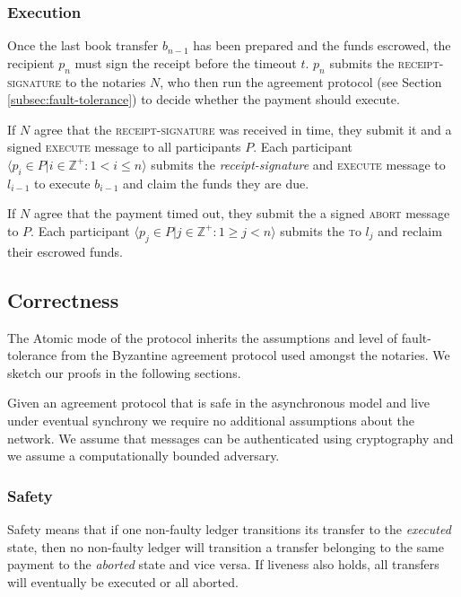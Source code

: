 \documentclass[letterpaper,twocolumn,10pt]{article}
\begin{document}
\subsubsection{Execution}

Once the last book transfer $b_{n-1}$ has been prepared and the funds escrowed, the recipient $p_n$ must sign the receipt before the timeout $t$. 
$p_n$ submits the \textsc{receipt-signature} to the notaries $N$, who then run the agreement protocol (see Section \ref{subsec:fault-tolerance}) to decide whether the payment should execute. 

If $N$ agree that the \textsc{receipt-signature} was received in time, they submit it and a signed \textsc{execute} message to all participants $P$. Each participant $ \langle p_i \in P | i \in \mathbb{Z}^+ : 1 < i \leq n \rangle $ submits the \textit{receipt-signature} and \textsc{execute} message to $l_{i-1}$ to execute $b_{i-1}$ and claim the funds they are due.

If $N$ agree that the payment timed out, they submit the a signed \textsc{abort} message to $P$. Each participant $ \langle p_j \in P | j \in \mathbb{Z}^+ : 1 \geq j < n \rangle $ submits the \textsc to $l_j$ and reclaim their escrowed funds. 

\subsection{Correctness}

The Atomic mode of the protocol inherits the assumptions and level of fault-tolerance from the Byzantine agreement protocol used amongst the notaries. We sketch our proofs in the following sections.

Given an agreement protocol that is safe in the asynchronous model and live under eventual synchrony we require no additional assumptions about the network. We assume that messages can be authenticated using cryptography and we assume a computationally bounded adversary.

\subsubsection{Safety}

Safety means that if one non-faulty ledger transitions its transfer to the \textit{executed} state, then no non-faulty ledger will transition a transfer belonging to the same payment to the \textit{aborted} state and vice versa. If liveness also holds, all transfers will eventually be executed or all aborted.
\end{document}
